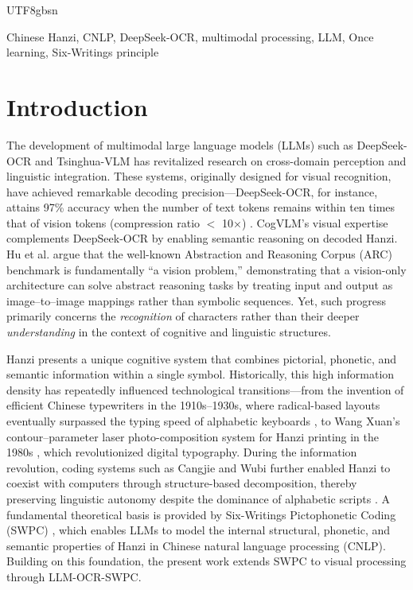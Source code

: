 \documentclass[conference]{IEEEtran}
\begin{document}
\begin{CJK*}{UTF8}{gbsn}
\begin{IEEEkeywords}
Chinese Hanzi, CNLP, DeepSeek-OCR, multimodal processing, LLM, Once learning, Six-Writings principle
\end{IEEEkeywords}

\section{Introduction}
The development of multimodal large language models (LLMs) such as DeepSeek-OCR \cite{wei2025deepseek} and Tsinghua-VLM \cite{wang2024cogvlm} has revitalized research on cross-domain perception and linguistic integration. These systems, originally designed for visual recognition, have achieved remarkable decoding precision—DeepSeek-OCR, for instance, attains 97\% accuracy when the number of text tokens remains within ten times that of vision tokens (compression ratio $<$ 10×) \cite{wei2025deepseek}. CogVLM's visual expertise complements DeepSeek-OCR by enabling semantic reasoning on decoded Hanzi. Hu et al. \cite{hu2025arc} argue that the well-known Abstraction and Reasoning Corpus (ARC) benchmark is fundamentally “a vision problem,” demonstrating that a vision-only architecture can solve abstract reasoning tasks by treating input and output as image–to–image mappings rather than symbolic sequences. Yet, such progress primarily concerns the \textit{recognition} of characters rather than their deeper \textit{understanding} in the context of cognitive and linguistic structures.

Hanzi presents a unique cognitive system that combines pictorial, phonetic, and semantic information within a single symbol. Historically, this high information density has repeatedly influenced technological transitions—from the invention of efficient Chinese typewriters in the 1910s–1930s, where radical-based layouts eventually surpassed the typing speed of alphabetic keyboards \cite{mullaney2017chinese,weigang2022typewriter}, to Wang Xuan’s contour–parameter laser photo-composition system for Hanzi printing in the 1980s \cite{wangxuan1997}, which revolutionized digital typography. During the information revolution, coding systems such as Cangjie and Wubi further enabled Hanzi to coexist with computers through structure-based decomposition, thereby preserving linguistic autonomy despite the dominance of alphabetic scripts \cite{weigang2025threshold}.  A fundamental theoretical basis is provided by Six-Writings Pictophonetic Coding (SWPC) \cite{weigang2024six}, which enables LLMs to model the internal structural, phonetic, and semantic properties of Hanzi in Chinese natural language processing (CNLP). Building on this foundation, the present work extends SWPC to visual processing through LLM-OCR-SWPC.


\end{CJK*}
\end{document}
